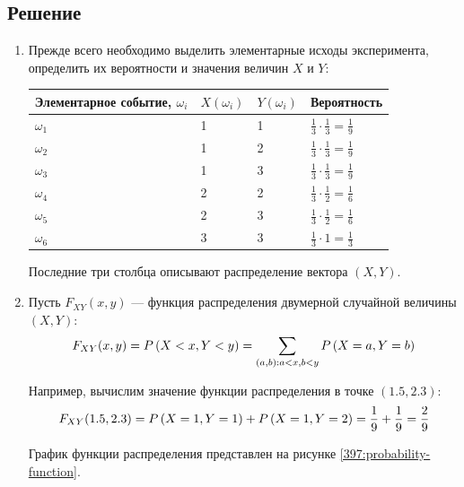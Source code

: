 \subsection*{Решение}
\begin{enumerate}
    \item Прежде всего необходимо выделить элементарные исходы эксперимента, определить их вероятности и значения величин $X$ и $Y$:

    \begin{tabular}{|p{5cm}|p{1cm}|p{1cm}|p{3cm}|}
        \hline
        Элементарное событие, $\omega_i$ & $X \left ( \omega_i \right )$ & $Y \left ( \omega_i \right )$
        & Вероятность
        \\
        \hline
        \hline
        $\omega_1$ & 1 & 1 & $\frac{1}{3} \cdot \frac{1}{3} = \frac{1}{9}$ \\
        \hline
        $\omega_2$ & 1 & 2 & $\frac{1}{3} \cdot \frac{1}{3} = \frac{1}{9}$ \\
        \hline
        $\omega_3$ & 1 & 3 & $\frac{1}{3} \cdot \frac{1}{3} = \frac{1}{9}$ \\
        \hline
        $\omega_4$ & 2 & 2 & $\frac{1}{3} \cdot \frac{1}{2} = \frac{1}{6}$ \\
        \hline
        $\omega_5$ & 2 & 3 & $\frac{1}{3} \cdot \frac{1}{2} = \frac{1}{6}$ \\
        \hline
        $\omega_6$ & 3 & 3 & $\frac{1}{3} \cdot 1 = \frac{1}{3}$           \\
        \hline
    \end{tabular}

    Последние три столбца описывают распределение вектора $\left ( X, Y \right )$.

    \item Пусть $F_{XY}(x, y)$ --- функция распределения двумерной случайной величины $(X, Y)$:
    \begin{equation}
        F_{XY}(x, y)
        = P \left ( X < x, Y < y \right )
        = \sum_{(a, b) : a < x, b < y} P \left ( X=a, Y=b \right )
    \end{equation}

    Например, вычислим значение функции распределения в точке $\left (1.5, 2.3 \right )$:
    \begin{equation}
        F_{XY}(1.5, 2.3) = P \left ( X=1, Y=1 \right ) + P \left ( X=1, Y=2 \right ) = \frac{1}{9} + \frac{1}{9} = \frac{2}{9}
    \end{equation}

    График функции распределения представлен на рисунке \ref{397:probability-function}.


\end{enumerate}
